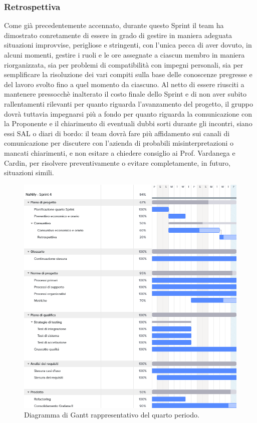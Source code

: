 \subsubsection{Retrospettiva}
Come già precedentemente accennato, durante questo Sprint il team ha dimostrato conretamente di essere in grado di gestire in maniera adeguata
situazioni improvvise, perigliose e stringenti, con l'unica pecca di aver dovuto, in alcuni momenti, gestire i ruoli e le ore assegnate
a ciascun membro in maniera riorganizzata, sia per problemi di compatibilità con impegni personali, sia per semplificare la risoluzione 
dei vari compiti sulla base delle conoscenze pregresse e del lavoro svolto fino a quel momento da ciascuno. Al netto di essere riusciti a
mantenere pressocchè inalterato il costo finale dello Sprint e di non aver subito rallentamenti rilevanti per quanto riguarda l'avanzamento
del progetto, il gruppo dovrà tuttavia impegnarsi più a fondo per quanto riguarda la comunicazione con la Proponente e il chiarimento
di eventuali dubbi sorti durante gli incontri, siano essi SAL o diari di bordo: il team dovrà fare più affidamento sui canali di comunicazione
per discutere con l'azienda di probabili misinterpretazioni o mancati chiarimenti, e non esitare a chiedere consiglio ai Prof. Vardanega e Cardin,
per risolvere preventivamente o evitare completamente, in futuro, situazioni simili. 
\begin{figure}[h!]
    \centering
    \includegraphics[width=13cm]{./asset/gantt4.png}
    \caption{Diagramma di Gantt rappresentativo del quarto periodo.}
\end{figure}
\clearpage